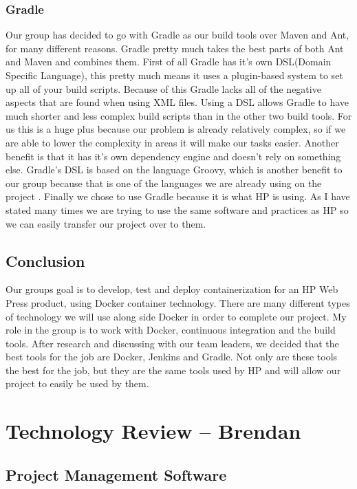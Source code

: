 \documentclass[onecolumn, draftclsnofoot,10pt, compsoc]{IEEEtran}
\begin{document}
\subsubsection{Gradle}
Our group has decided to go with Gradle as our build tools over Maven and Ant, for many different reasons. Gradle pretty much takes the best parts of both Ant and Maven and combines them. First of all Gradle has it's own DSL(Domain Specific Language), this pretty much means it uses a plugin-based system to set up all of your build scripts. Because of this Gradle lacks all of the negative aspects that are found when using XML files. Using a DSL allows Gradle to have much shorter and less complex build scripts than in the other two build tools. For us this is a huge plus because our problem is already relatively complex, so if we are able to lower the complexity in areas it will make our tasks easier. Another benefit is that it has it's own dependency engine and doesn't rely on something else. Gradle's DSL is based on the language Groovy, which is another benefit to our group because that is one of the languages we are already using on the project \cite{GradleAntMaven}. Finally we chose to use Gradle because it is what HP is using. As I have stated many times we are trying to use the same software and practices as HP so we can easily transfer our project over to them.

\subsection{Conclusion}
Our groups goal is to develop, test and deploy containerization for an HP Web Press product, using Docker container technology. There are many different types of technology we will use along side Docker in order to complete our project. My role in the group is to work with Docker, continuous integration and the build tools. After research and discussing with our team leaders, we decided that the best tools for the job are Docker, Jenkins and Gradle. Not only are these tools the best for the job, but they are the same tools used by HP and will allow our project to easily be used by them. 
\section{Technology Review -- Brendan}
\subsection{Project Management Software}
\end{document}
